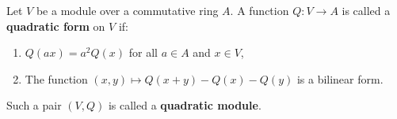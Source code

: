 Let $V$ be a module over a commutative ring $A$. A function $Q: V \to A$ is called a \textbf{quadratic form} on $V$ if:

\begin{enumerate}
  \item $Q(ax) = a^2 Q(x)$ for all $a \in A$ and $x \in V$,
  \item The function $(x, y) \mapsto Q(x+y) - Q(x) - Q(y)$ is a bilinear form.
\end{enumerate}

Such a pair $(V, Q)$ is called a \textbf{quadratic module}.
